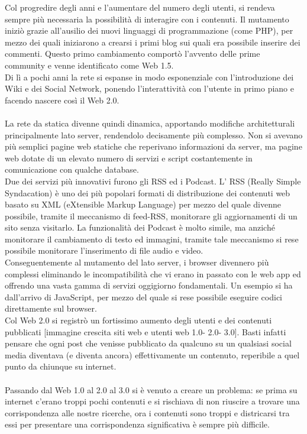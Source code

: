 \documentclass{report}%
\theoremstyle{plain}
\begin{document}
Col progredire degli anni e l'aumentare del numero degli utenti, si rendeva sempre più necessaria la possibilità di interagire con i contenuti. Il mutamento iniziò grazie all'ausilio dei nuovi linguaggi di programmazione (come PHP), per mezzo dei quali iniziarono a crearsi i primi blog sui quali era possibile inserire dei commenti. Questo primo cambiamento comportò l'avvento delle prime community e venne identificato come Web 1.5. \\Di lì a pochi anni la rete si espanse in modo esponenziale con l'introduzione dei Wiki e dei Social Network, ponendo l'interattività con l'utente in primo piano e facendo nascere così il Web 2.0.\\\\
La rete da statica divenne quindi dinamica, apportando modifiche architetturali principalmente lato server, rendendolo decisamente più complesso. Non si avevano più semplici pagine web statiche che reperivano informazioni da server, ma pagine web dotate di un elevato numero di servizi e script costantemente in comunicazione con qualche database. \\ Due dei servizi più innovativi furono gli RSS ed i Podcast. L' RSS (Really Simple Syndacation) è uno dei più popolari formati di distribuzione dei contenuti web basato su XML (eXtensible Markup Language) per mezzo del quale divenne possibile, tramite il meccanismo di feed-RSS, monitorare gli aggiornamenti di un sito senza visitarlo. La funzionalità dei Podcast è molto simile, ma anziché monitorare il cambiamento di testo ed immagini, tramite tale meccanismo si rese possibile monitorare l'inserimento di file audio e video.\\
Conseguentemente al mutamento del lato server, i browser divennero  più complessi eliminando le incompatibilità che vi erano in passato con le web app ed offrendo una vasta gamma di servizi oggigiorno fondamentali. Un esempio si ha dall'arrivo di JavaScript, per mezzo del quale si rese possibile eseguire codici direttamente sul browser. \\ Col Web 2.0 si registrò un fortissimo aumento degli utenti e dei contenuti pubblicati [immagine crescita siti web e utenti web 1.0- 2.0- 3.0]. Basti infatti pensare che ogni post che venisse pubblicato da qualcuno su un qualsiasi social media diventava (e diventa ancora) effettivamente un contenuto, reperibile a quel punto da chiunque su internet.\\\\
Passando dal Web 1.0 al 2.0 al 3.0 si è venuto a creare un problema: se prima su internet c'erano troppi pochi contenuti e si rischiava di non riuscire a trovare una corrispondenza alle nostre ricerche, ora i contenuti sono troppi e districarsi tra essi per presentare una corrispondenza significativa è sempre più difficile.\\
\end{document}
